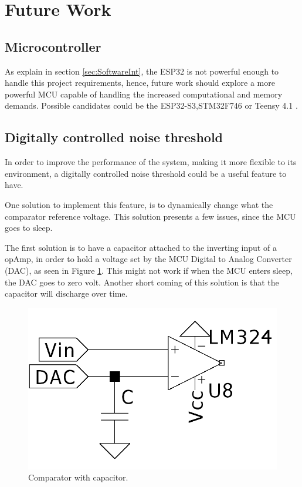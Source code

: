 \section{Future Work}


\subsection{Microcontroller}

As explain in section \ref{sec:SoftwareInt}, the ESP32 is not powerful enough to handle this project requirements, hence, future work should explore a more powerful MCU capable of handling the increased computational and memory demands. Possible candidates could be the ESP32-S3,STM32F746 or Teensy 4.1 .

\subsection{Digitally controlled noise threshold }

In order to improve the performance of the system, making it more flexible to its environment, a digitally controlled noise threshold could be a useful feature to have. 

One solution to implement this feature, is to dynamically change what the comparator reference voltage. This solution presents a few issues, since the MCU goes to sleep.

The first solution is to have a capacitor attached to the inverting input of a opAmp, in order to hold a voltage set by the MCU Digital to Analog Converter (DAC), as seen in Figure \ref{fig:CompCap}. This might not work if when the MCU enters sleep, the DAC goes to zero volt. Another short coming of this solution is that the capacitor will discharge over time. 

\begin{figure}[H]
    \centering
    \includegraphics*[scale = 0.3]{Images/ComparatorCap.png}
    \caption{Comparator with capacitor.}
    \label{fig:CompCap}
\end{figure}

